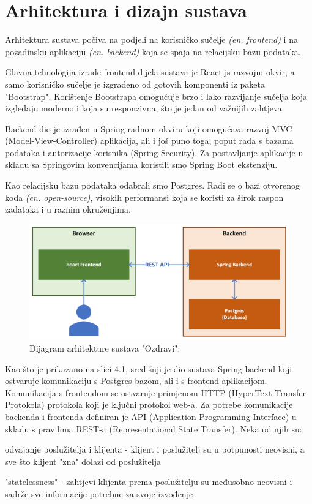 \chapter{Arhitektura i dizajn sustava}
		Arhitektura sustava počiva na podjeli na korisničko sučelje \textit{(en. frontend)} i na pozadinsku aplikaciju \textit{(en. backend)} koja se spaja na relacijsku bazu podataka.

		Glavna tehnologija izrade frontend dijela sustava je React.js razvojni okvir, a samo korisničko sučelje je izgrađeno od gotovih komponenti iz paketa "Bootstrap". Korištenje Bootstrapa omogućuje brzo i lako razvijanje sučelja koja izgledaju moderno i koja su responzivna, 
		što je jedan od važnijih zahtjeva. 

		Backend dio je izrađen u Spring radnom okviru koji omogućava razvoj MVC (Model-View-Controller) aplikacija, ali i još puno toga, poput rada s bazama podataka i autorizacije korisnika (Spring Security). 
		Za postavljanje aplikacije u skladu sa Springovim konvencijama koristili smo Spring Boot ekstenziju.

		Kao relacijsku bazu podataka odabrali smo Postgres. Radi se o bazi otvorenog koda \textit{(en. open-source)}, visokih performansi koja se koristi za širok raspon zadataka i u raznim okruženjima.

		\begin{figure}[H]
			\includegraphics[width=\textwidth]{slike/architecture.png} 
			\caption{Dijagram arhitekture sustava "Ozdravi".} 
		\end{figure}

		Kao što je prikazano na slici 4.1, središnji je dio sustava Spring backend koji ostvaruje komunikaciju s Postgres bazom, ali i s frontend aplikacijom. Komunikacija s frontendom se ostvaruje primjenom
		HTTP (HyperText Transfer Protokola) protokola koji je ključni protokol web-a. Za potrebe komunikacije backenda i frontenda definiran je API (Application Programming Interface) u skladu s pravilima REST-a (Representational State Transfer). Neka od njih su:
		\begin{packed_item}
			\item odvajanje poslužitelja i klijenta - klijent i poslužitelj su u potpunosti neovisni, a sve što klijent "zna" dolazi od poslužitelja
			\item "statelessness" - zahtjevi klijenta prema poslužitelju su međusobno neovisni i sadrže sve informacije potrebne za svoje izvođenje
		\end{packed_item}

